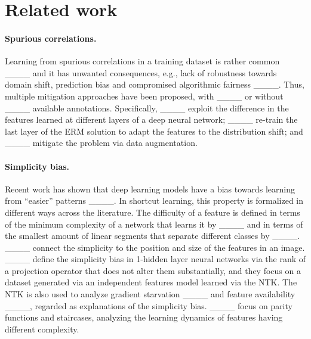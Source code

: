\section{Related work}
\label{sec:rel}


\paragraph{Spurious correlations.} Learning from spurious correlations in a training dataset is rather common %
____ and it has %
unwanted consequences, e.g., lack of robustness towards domain shift, prediction bias and compromised algorithmic fairness ____.
Thus, multiple mitigation approaches have been proposed, with ____ or without ____ available annotations. Specifically, ____ exploit the difference in the features learned at different layers of a deep neural network; ____ re-train the last layer of the ERM solution to adapt the features to the distribution shift; and ____ mitigate the problem via data augmentation.






\vspace{-0.2cm}

\paragraph{Simplicity bias.}
Recent work has shown that deep learning models have a bias towards learning from ``easier'' patterns ____. In %
shortcut learning, this property is formalized in different ways across the %
literature. The difficulty of a feature is defined in terms of the minimum complexity of a network that learns it by ____ and in terms of the smallest amount of linear segments that separate different classes by ____. ____
connect the simplicity to the position and size of the features in an image. %
____ define the simplicity bias in 1-hidden layer neural networks via the rank of a projection operator that does not alter them substantially, and they focus on a dataset generated via an independent features model learned via the NTK. The NTK is also used to analyze gradient starvation ____ and feature availability ____, regarded as explanations of the simplicity bias. ____ focus on parity functions and staircases, analyzing the learning dynamics of features having different complexity.


